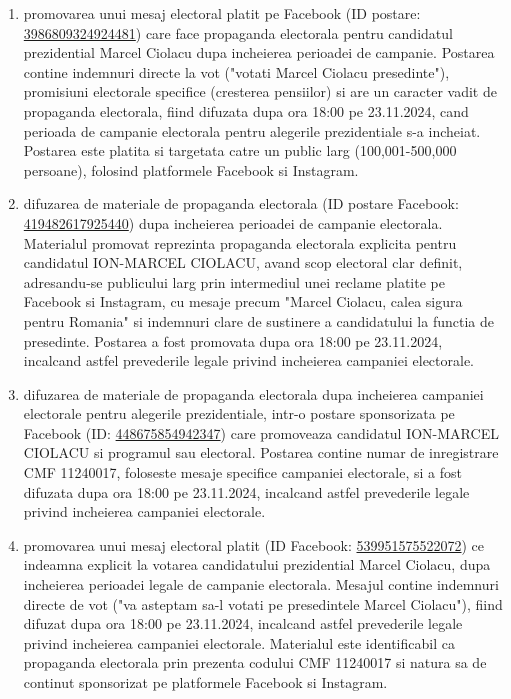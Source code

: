 \documentclass[a4paper,12pt]{article}
\begin{document}
\begin{enumerate}[leftmargin=*, label=\arabic*.)]
    \item promovarea unui mesaj electoral platit pe Facebook (ID postare: \href{https://www.facebook.com/ads/library/?id=3986809324924481}{3986809324924481}) care face propaganda electorala pentru candidatul prezidential Marcel Ciolacu dupa incheierea perioadei de campanie. Postarea contine indemnuri directe la vot ("votati Marcel Ciolacu presedinte"), promisiuni electorale specifice (cresterea pensiilor) si are un caracter vadit de propaganda electorala, fiind difuzata dupa ora 18:00 pe 23.11.2024, cand perioada de campanie electorala pentru alegerile prezidentiale s-a incheiat. Postarea este platita si targetata catre un public larg (100,001-500,000 persoane), folosind platformele Facebook si Instagram.
    \item difuzarea de materiale de propaganda electorala (ID postare Facebook: \href{https://www.facebook.com/ads/library/?id=419482617925440}{419482617925440}) dupa incheierea perioadei de campanie electorala. Materialul promovat reprezinta propaganda electorala explicita pentru candidatul ION-MARCEL CIOLACU, avand scop electoral clar definit, adresandu-se publicului larg prin intermediul unei reclame platite pe Facebook si Instagram, cu mesaje precum "Marcel Ciolacu, calea sigura pentru Romania" si indemnuri clare de sustinere a candidatului la functia de presedinte. Postarea a fost promovata dupa ora 18:00 pe 23.11.2024, incalcand astfel prevederile legale privind incheierea campaniei electorale.
    \item difuzarea de materiale de propaganda electorala dupa incheierea campaniei electorale pentru alegerile prezidentiale, intr-o postare sponsorizata pe Facebook (ID: \href{https://www.facebook.com/ads/library/?id=448675854942347}{448675854942347}) care promoveaza candidatul ION-MARCEL CIOLACU si programul sau electoral. Postarea contine numar de inregistrare CMF 11240017, foloseste mesaje specifice campaniei electorale, si a fost difuzata dupa ora 18:00 pe 23.11.2024, incalcand astfel prevederile legale privind incheierea campaniei electorale.
    \item promovarea unui mesaj electoral platit (ID Facebook: \href{https://www.facebook.com/ads/library/?id=539951575522072}{539951575522072}) ce indeamna explicit la votarea candidatului prezidential Marcel Ciolacu, dupa incheierea perioadei legale de campanie electorala. Mesajul contine indemnuri directe de vot ("va asteptam sa-l votati pe presedintele Marcel Ciolacu"), fiind difuzat dupa ora 18:00 pe 23.11.2024, incalcand astfel prevederile legale privind incheierea campaniei electorale. Materialul este identificabil ca propaganda electorala prin prezenta codului CMF 11240017 si natura sa de continut sponsorizat pe platformele Facebook si Instagram.

\end{enumerate}
\end{document}
